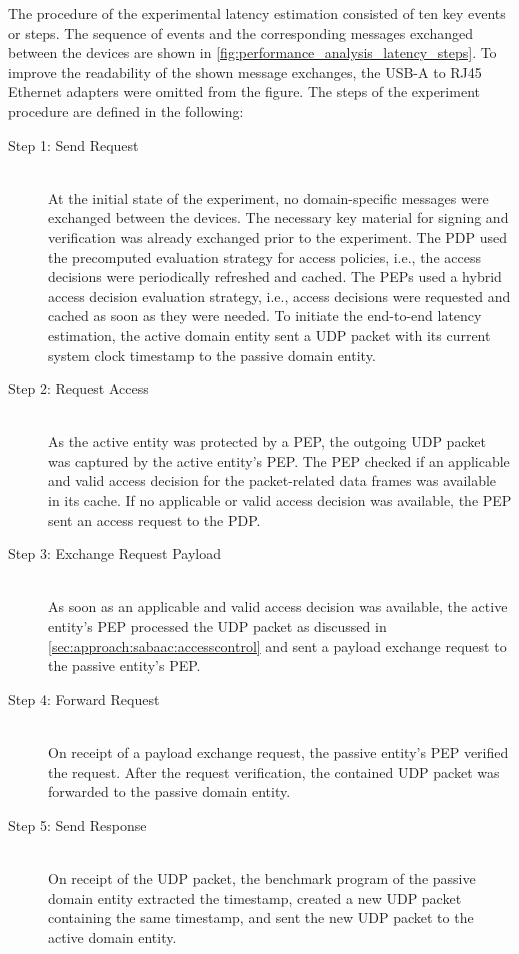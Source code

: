 The procedure of the experimental latency estimation consisted of ten key events or steps.
The sequence of events and the corresponding messages exchanged between the devices are shown in \autoref{fig:performance_analysis_latency_steps}.
To improve the readability of the shown message exchanges, the USB-A to RJ45 Ethernet adapters were omitted from the figure.
The steps of the experiment procedure are defined in the following:
\begin{description}
    \item[Step 1: Send Request]~\\
    At the initial state of the experiment, no domain-specific messages were exchanged between the devices.
    The necessary key material for signing and verification was already exchanged prior to the experiment.
    The PDP used the precomputed evaluation strategy for access policies, i.e., the access decisions were periodically refreshed and cached.
    The PEPs used a hybrid access decision evaluation strategy, i.e., access decisions were requested and cached as soon as they were needed.
    To initiate the end-to-end latency estimation, the active domain entity sent a UDP packet with its current system clock timestamp to the passive domain entity.

    \item[Step 2: Request Access]~\\
    As the active entity was protected by a PEP, the outgoing UDP packet was captured by the active entity's PEP.
    The PEP checked if an applicable and valid access decision for the packet-related data frames was available in its cache.
    If no applicable or valid access decision was available, the PEP sent an access request to the PDP.

    \item[Step 3: Exchange Request Payload]~\\
    As soon as an applicable and valid access decision was available, the active entity's PEP processed the UDP packet as discussed in \autoref{sec:approach:sabaac:accesscontrol} and sent a payload exchange request to the passive entity's PEP.

    \item[Step 4: Forward Request]~\\
    On receipt of a payload exchange request, the passive entity's PEP verified the request.
    After the request verification, the contained UDP packet was forwarded to the passive domain entity.

    \item[Step 5: Send Response]~\\
    On receipt of the UDP packet, the benchmark program of the passive domain entity extracted the timestamp, created a new UDP packet containing the same timestamp, and sent the new UDP packet to the active domain entity.


\end{description}
